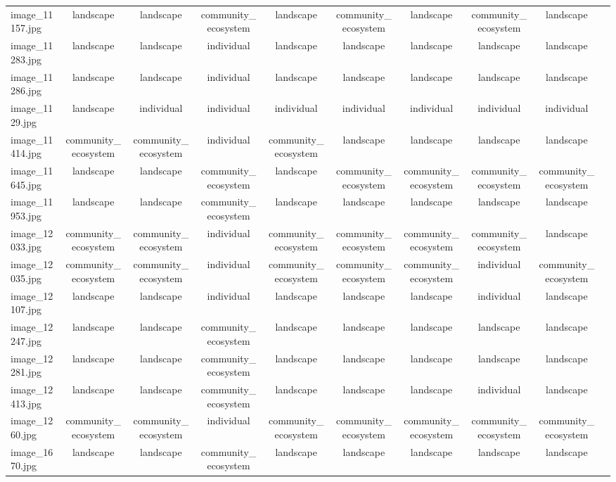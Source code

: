 \documentclass[hidelinks, 11pt]{article}
\begin{document}
\begin{longtable}{@{}lccccccccc@{}}
image\_11157.jpg & landscape & landscape & community\_ecosystem & landscape & community\_ecosystem & landscape & community\_ecosystem & landscape \\
image\_11283.jpg & landscape & landscape & individual & landscape & landscape & landscape & landscape & landscape \\
image\_11286.jpg & landscape & landscape & individual & landscape & landscape & landscape & landscape & landscape \\
image\_1129.jpg  & landscape & individual & individual & individual & individual & individual & individual & individual \\
image\_11414.jpg & community\_ecosystem & community\_ecosystem & individual & community\_ecosystem & landscape & landscape & landscape & landscape \\
image\_11645.jpg & landscape & landscape & community\_ecosystem & landscape & community\_ecosystem & community\_ecosystem & community\_ecosystem & community\_ecosystem \\
image\_11953.jpg & landscape & landscape & community\_ecosystem & landscape & landscape & landscape & landscape & landscape \\
image\_12033.jpg & community\_ecosystem & community\_ecosystem & individual & community\_ecosystem & community\_ecosystem & community\_ecosystem & community\_ecosystem & landscape \\
image\_12035.jpg & community\_ecosystem & community\_ecosystem & individual & community\_ecosystem & community\_ecosystem & community\_ecosystem & individual & community\_ecosystem \\
image\_12107.jpg & landscape & landscape & individual & landscape & landscape & landscape & individual & landscape \\
image\_12247.jpg & landscape & landscape & community\_ecosystem & landscape & landscape & landscape & landscape & landscape \\
image\_12281.jpg & landscape & landscape & community\_ecosystem & landscape & landscape & landscape & landscape & landscape \\
image\_12413.jpg & landscape & landscape & community\_ecosystem & landscape & landscape & landscape & individual & landscape \\
image\_1260.jpg  & community\_ecosystem & community\_ecosystem & individual & community\_ecosystem & community\_ecosystem & community\_ecosystem & community\_ecosystem & community\_ecosystem \\
image\_1670.jpg  & landscape & landscape & community\_ecosystem & landscape & landscape & landscape & landscape & landscape \\

\end{longtable}
\end{document}
